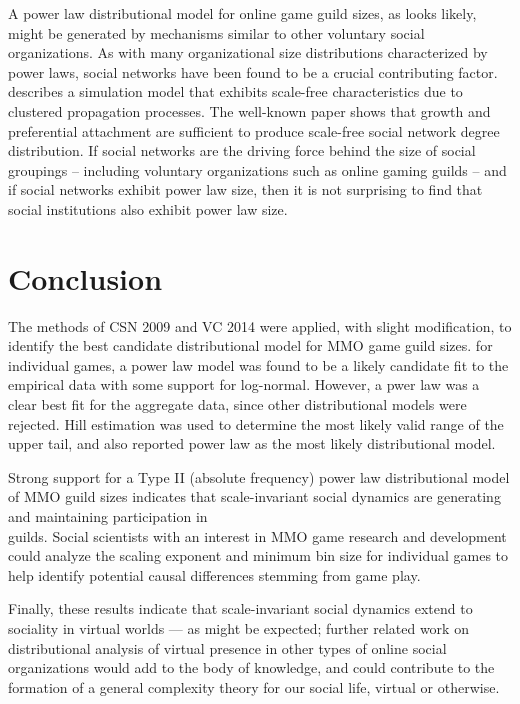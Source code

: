 \documentclass[pdftex,12pt]{llncs}
\begin{document}
A power law distributional model for online game guild sizes, as looks likely, might be generated by mechanisms similar to other voluntary social organizations.
As with many organizational size distributions characterized by power laws, social networks have been found to be a crucial contributing factor.
\parencite{liljeros2008} describes a simulation model that exhibits scale-free characteristics due to clustered propagation processes.
The well-known \parencite{BA1999} paper shows that growth and preferential attachment are sufficient to produce scale-free social network degree distribution.
If social networks are the driving force behind the size of social groupings – including voluntary organizations such as online gaming guilds – and if social networks exhibit power law size, then it is not surprising to find that social institutions also exhibit power law size.

\section{Conclusion}
The methods of CSN 2009 and VC 2014 were applied, with slight modification, to identify the best candidate distributional model for MMO game guild sizes.
for individual games, a power law model was found to be a likely candidate fit to the empirical data with some support for log-normal. However, a pwer law was a clear best fit for the aggregate data, since other distributional models were rejected.
Hill estimation was used to determine the most likely valid range of the upper tail, and also reported power law as the most likely distributional model.

Strong support for a Type II (absolute frequency) power law distributional model of MMO guild sizes indicates that scale-invariant social dynamics are generating and maintaining participation in\\guilds.
Social scientists with an interest in MMO game research and development could analyze the scaling exponent and minimum bin size for individual games to help identify potential causal differences stemming from game play.

Finally, these results indicate that scale-invariant social dynamics extend to sociality in virtual worlds --- as might be expected; further related work on distributional analysis of virtual presence in other types of online social organizations would add to the body of knowledge, and could contribute to the formation of a general complexity theory for our social life, virtual or otherwise.

\printbibliography
\end{document}
